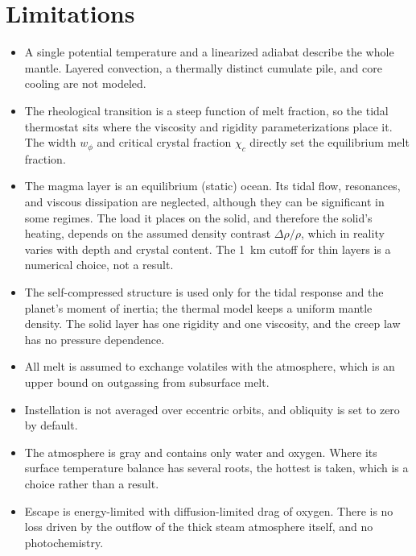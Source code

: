 \documentclass[11pt]{article}
\begin{document}
\section{Limitations}\label{sec:limitations}

\begin{itemize}
\item A single potential temperature and a linearized adiabat describe the whole mantle. Layered convection, a thermally distinct cumulate pile, and core cooling are not modeled.
\item The rheological transition is a steep function of melt fraction, so the tidal thermostat sits where the viscosity and rigidity parameterizations place it. The width $w_\phi$ and critical crystal fraction $\chi_c$ directly set the equilibrium melt fraction.
\item The magma layer is an equilibrium (static) ocean. Its tidal flow, resonances, and viscous dissipation are neglected, although they can be significant in some regimes. The load it places on the solid, and therefore the solid's heating, depends on the assumed density contrast $\Delta\rho / \rho$, which in reality varies with depth and crystal content. The 1~km cutoff for thin layers is a numerical choice, not a result.
\item The self-compressed structure is used only for the tidal response and the planet's moment of inertia; the thermal model keeps a uniform mantle density. The solid layer has one rigidity and one viscosity, and the creep law has no pressure dependence.
\item All melt is assumed to exchange volatiles with the atmosphere, which is an upper bound on outgassing from subsurface melt.
\item Instellation is not averaged over eccentric orbits, and obliquity is set to zero by default.
\item The atmosphere is gray and contains only water and oxygen. Where its surface temperature balance has several roots, the hottest is taken, which is a choice rather than a result.
\item Escape is energy-limited with diffusion-limited drag of oxygen. There is no loss driven by the outflow of the thick steam atmosphere itself, and no photochemistry.
\end{itemize}
\end{document}
